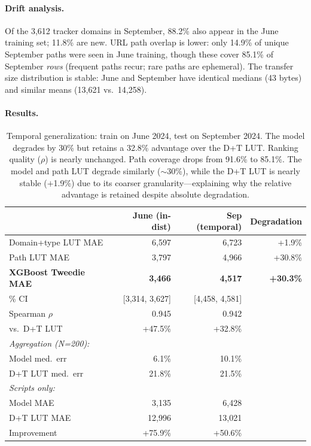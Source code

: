 \documentclass[sigconf,nonacm]{acmart}
\begin{document}
\paragraph{Drift analysis.}
Of the 3,612 tracker domains in September, 88.2\% also appear in the June training set; 11.8\% are new.
URL path overlap is lower: only 14.9\% of unique September paths were seen in June training, though these cover 85.1\% of September \emph{rows} (frequent paths recur; rare paths are ephemeral).
The transfer size distribution is stable: June and September have identical medians (43 bytes) and similar means (13,621 vs.\ 14,258).

\paragraph{Results.}

\begin{table}[t]
\centering
\small
\begin{tabular}{lrrr}
\toprule
& June (in-dist) & Sep (temporal) & Degradation \\
\midrule
Domain+type LUT MAE & 6,597 & 6,723 & +1.9\% \\
Path LUT MAE & 3,797 & 4,966 & +30.8\% \\
\textbf{XGBoost Tweedie MAE} & \textbf{3,466} & \textbf{4,517} & \textbf{+30.3\%} \\
\quad 95\% CI & [3,314, 3,627] & [4,458, 4,581] & \\
\quad Spearman $\rho$ & 0.945 & 0.942 & \\
\quad vs.\ D+T LUT & +47.5\% & +32.8\% & \\
\midrule
\multicolumn{3}{l}{\emph{Aggregation (N=200):}} \\
\quad Model med.\ err & 6.1\% & 10.1\% & \\
\quad D+T LUT med.\ err & 21.8\% & 21.5\% & \\
\midrule
\multicolumn{3}{l}{\emph{Scripts only:}} \\
\quad Model MAE & 3,135 & 6,428 & \\
\quad D+T LUT MAE & 12,996 & 13,021 & \\
\quad Improvement & +75.9\% & +50.6\% & \\
\bottomrule
\end{tabular}
\caption{Temporal generalization: train on June 2024, test on September 2024. The model degrades by 30\% but retains a 32.8\% advantage over the D+T LUT. Ranking quality ($\rho$) is nearly unchanged. Path coverage drops from 91.6\% to 85.1\%. The model and path LUT degrade similarly ($\sim$30\%), while the D+T LUT is nearly stable ($+$1.9\%) due to its coarser granularity---explaining why the relative advantage is retained despite absolute degradation.}
\label{tab:temporal}
\end{table}
\end{document}
